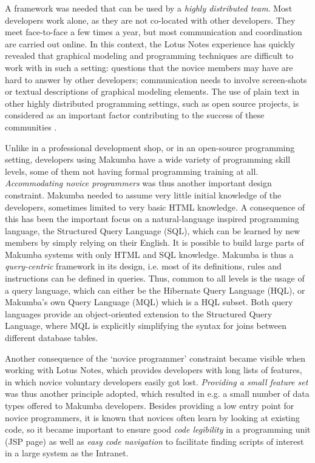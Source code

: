 \documentclass{chi2009}
\begin{document}
A framework was needed that can be used by a \textit{highly distributed team}. Most developers work alone, as they are not co-located with other developers. They meet face-to-face a few times a year, but most communication and coordination are carried out online. In this context, the Lotus Notes experience has quickly revealed that graphical modeling and programming techniques are difficult to work with in such a setting: questions that the novice members may have are hard to answer by other developers; communication needs to involve screen-shots or textual descriptions of graphical modeling elements. The use of plain text in other highly distributed programming settings, such as open source projects, is considered as an important factor contributing to the success of these communities \cite{yamauchi00}. 

Unlike in a professional development shop, or in an open-source programming setting, developers using Makumba have a wide variety of programming skill levels, some of them not having formal programming training at all. \textit{Accommodating novice programmers} was thus another important design constraint. Makumba needed to assume very little initial knowledge of the developers, sometimes limited to very basic HTML knowledge. A consequence of this has been the important focus on a natural-language inspired programming language, the Structured Query Language (SQL), which can be learned by new members by simply relying on their English. It is possible to build large parts of Makumba systems with only HTML and SQL knowledge. Makumba is thus a \textit{query-centric} framework in its design, i.e. most of its definitions, rules and instructions can be defined in queries. Thus, common to all levels is the usage of a query language, which can either be the Hibernate Query Language (HQL), or Makumba's own Query Language (MQL) which is a HQL subset. Both query languages provide an object-oriented extension to the Structured Query Language, where MQL is explicitly simplifying the syntax for joins between different database tables.

Another consequence of the `novice programmer' constraint became visible when working with Lotus Notes, which provides developers with long lists of features, in which novice  voluntary developers easily got lost. \textit{Providing a small feature set} was thus another principle adopted, which resulted in e.g. a small number of data types offered to  Makumba developers. Besides providing a low entry point for novice programmers, it is known that novices often learn by looking at existing code, so it became important to ensure good \textit{code legibility} in a programming unit (JSP page) as well as \textit{easy code navigation} to facilitate finding scripts of interest in a large system as the Intranet.
\end{document}

